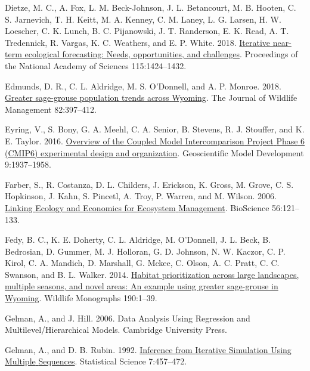 \documentclass[
  12pt,
]{article}
\newlength{\cslhangindent}
\newlength{\cslentryspacingunit} %
\newenvironment{CSLReferences}[2] %
 {%
  \setlength{\parindent}{0pt}
  \ifodd #1
  \let\oldpar\par
  \def\par{\hangindent=\cslhangindent\oldpar}
  \fi
  \setlength{\parskip}{#2\cslentryspacingunit}
 }%
 {}
\begin{document}
\begin{CSLReferences}{1}{0}
\leavevmode{}%
Dietze, M. C., A. Fox, L. M. Beck-Johnson, J. L. Betancourt, M. B. Hooten, C. S. Jarnevich, T. H. Keitt, M. A. Kenney, C. M. Laney, L. G. Larsen, H. W. Loescher, C. K. Lunch, B. C. Pijanowski, J. T. Randerson, E. K. Read, A. T. Tredennick, R. Vargas, K. C. Weathers, and E. P. White. 2018. \href{https://doi.org/10.1073/pnas.1710231115}{Iterative near-term ecological forecasting: {Needs}, opportunities, and challenges}. Proceedings of the National Academy of Sciences 115:1424--1432.

\leavevmode{}%
Edmunds, D. R., C. L. Aldridge, M. S. O'Donnell, and A. P. Monroe. 2018. \href{https://doi.org/10.1002/jwmg.21386}{Greater sage-grouse population trends across {Wyoming}}. The Journal of Wildlife Management 82:397--412.

\leavevmode{}%
Eyring, V., S. Bony, G. A. Meehl, C. A. Senior, B. Stevens, R. J. Stouffer, and K. E. Taylor. 2016. \href{https://doi.org/10.5194/gmd-9-1937-2016}{Overview of the {Coupled} {Model} {Intercomparison} {Project} {Phase} 6 ({CMIP6}) experimental design and organization}. Geoscientific Model Development 9:1937--1958.

\leavevmode{}%
Farber, S., R. Costanza, D. L. Childers, J. Erickson, K. Gross, M. Grove, C. S. Hopkinson, J. Kahn, S. Pincetl, A. Troy, P. Warren, and M. Wilson. 2006. \href{https://doi.org/10.1641/0006-3568(2006)056\%5B0121:LEAEFE\%5D2.0.CO;2}{Linking {Ecology} and {Economics} for {Ecosystem} {Management}}. BioScience 56:121--133.

\leavevmode{}%
Fedy, B. C., K. E. Doherty, C. L. Aldridge, M. O'Donnell, J. L. Beck, B. Bedrosian, D. Gummer, M. J. Holloran, G. D. Johnson, N. W. Kaczor, C. P. Kirol, C. A. Mandich, D. Marshall, G. Mckee, C. Olson, A. C. Pratt, C. C. Swanson, and B. L. Walker. 2014. \href{https://doi.org/10.1002/wmon.1014}{Habitat prioritization across large landscapes, multiple seasons, and novel areas: {An} example using greater sage-grouse in {Wyoming}}. Wildlife Monographs 190:1--39.

\leavevmode{}%
Gelman, A., and J. Hill. 2006. Data {Analysis} {Using} {Regression} and {Multilevel}/{Hierarchical} {Models}. Cambridge University Press.

\leavevmode{}%
Gelman, A., and D. B. Rubin. 1992. \href{https://doi.org/10.1214/ss/1177011136}{Inference from {Iterative} {Simulation} {Using} {Multiple} {Sequences}}. Statistical Science 7:457--472.


\end{CSLReferences}
\end{document}
